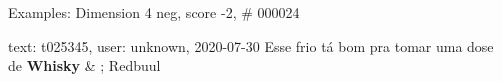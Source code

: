 \begin{frame}{Examples: Dimension 4 neg, score -2, \# 000024}
\footnotesize
\begin{alertblock}{text: t025345, user: unknown, 2020-07-30}
Esse frio tá bom pra tomar uma dose de \textbf{Whisky} \& ; Redbuul 
\textbf{} 
\end{alertblock}
\end{frame}
